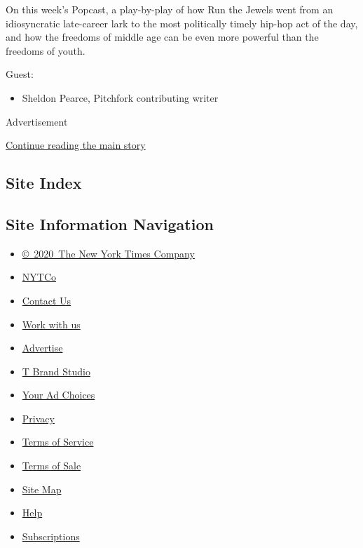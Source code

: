 On this week's Popcast, a play-by-play of how Run the Jewels went from
an idiosyncratic late-career lark to the most politically timely hip-hop
act of the day, and how the freedoms of middle age can be even more
powerful than the freedoms of youth.

Guest:

\begin{itemize}
\tightlist
\item
  Sheldon Pearce, Pitchfork contributing writer
\end{itemize}

Advertisement

\protect\hyperlink{after-bottom}{Continue reading the main story}

\hypertarget{site-index}{%
\subsection{Site Index}\label{site-index}}

\hypertarget{site-information-navigation}{%
\subsection{Site Information
Navigation}\label{site-information-navigation}}

\begin{itemize}
\tightlist
\item
  \href{https://help.nytimes.com/hc/en-us/articles/115014792127-Copyright-notice}{©~2020~The
  New York Times Company}
\end{itemize}

\begin{itemize}
\tightlist
\item
  \href{https://www.nytco.com/}{NYTCo}
\item
  \href{https://help.nytimes.com/hc/en-us/articles/115015385887-Contact-Us}{Contact
  Us}
\item
  \href{https://www.nytco.com/careers/}{Work with us}
\item
  \href{https://nytmediakit.com/}{Advertise}
\item
  \href{http://www.tbrandstudio.com/}{T Brand Studio}
\item
  \href{https://www.nytimes.com/privacy/cookie-policy\#how-do-i-manage-trackers}{Your
  Ad Choices}
\item
  \href{https://www.nytimes.com/privacy}{Privacy}
\item
  \href{https://help.nytimes.com/hc/en-us/articles/115014893428-Terms-of-service}{Terms
  of Service}
\item
  \href{https://help.nytimes.com/hc/en-us/articles/115014893968-Terms-of-sale}{Terms
  of Sale}
\item
  \href{https://spiderbites.nytimes.com}{Site Map}
\item
  \href{https://help.nytimes.com/hc/en-us}{Help}
\item
  \href{https://www.nytimes.com/subscription?campaignId=37WXW}{Subscriptions}
\end{itemize}
